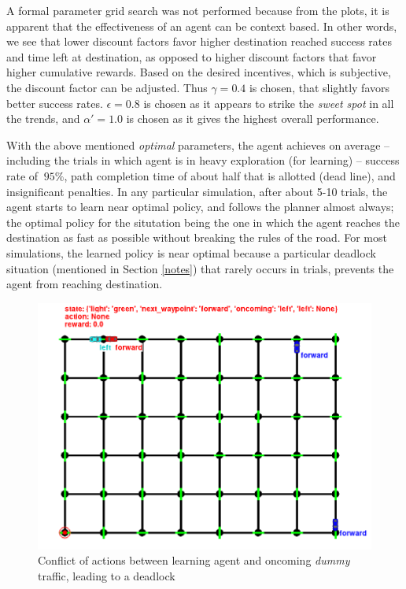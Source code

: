 \documentclass{article}
\begin{document}
	A formal parameter grid search was not performed because from the plots, it is apparent that the effectiveness of an agent can be context based. In other words, we see that lower discount factors favor higher destination reached success rates and time left at destination, as opposed to higher discount factors that favor higher cumulative rewards. Based on the desired incentives, which is subjective, the discount factor can be adjusted. Thus $\gamma = 0.4$ is chosen, that slightly favors better success rates. $\epsilon = 0.8$ is chosen as it appears to strike the \emph{sweet spot} in all the trends, and $\alpha\prime = 1.0$ is chosen as it gives the highest overall performance.
	
	With the above mentioned \emph{optimal} parameters, the agent achieves on average -- including the trials in which agent is in heavy exploration (for learning) -- success rate of $~95\%$, path completion time of about half that is allotted (dead line), and insignificant penalties. In any particular simulation, after about 5-10 trials, the agent starts to learn near optimal policy, and follows the planner almost always; the optimal policy for the situtation being the one in which the agent reaches the destination as fast as possible without breaking the rules of the road. For most simulations, the learned policy is near optimal because a particular deadlock situation (mentioned in Section \ref{notes}) that rarely occurs in trials, prevents the agent from reaching destination.
	
	\begin{figure}[b]
		\centering
		\includegraphics[scale=0.5]{conflict}
		\caption{Conflict of actions between learning agent and oncoming \emph{dummy} traffic, leading to a deadlock}
		\label{fig:agent_conflict}
	\end{figure}
	
\end{document}
